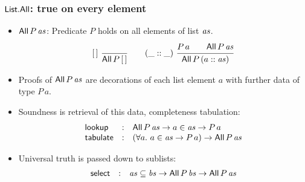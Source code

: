 \documentclass[t,fleqn,usenames,dvipsnames]{beamer}
\begin{document}
\newcommand{\All}{\mathsf{All}}
\newcommand{\ttabulate}{\mathsf{tabulate}}
\newcommand{\tselect}{\mathsf{select}}

\begin{frame}%
  \frametitle{$\List.\All$: true on every element}
  \vspace{-3ex}
  \begin{itemize}
  \item $\All\,P\,\vas$: Predicate $P$ holds on all elements of list $\mathit{as}$.
\[
  \nru{[\,]}{}{\All\,P\,[\,]}
\qquad
  \nru{(\_::\_)}{P\,a \qquad \All\,P\,\vas}{\All\,P\,(a :: \vas)}
\]
  \item Proofs of $\All\,P\,\vas$ are decorations of each list element
    $a$ with further data of type $P\,a$.
  \item Soundness is retrieval of this data, completeness tabulation:
\[
  \begin{array}{lcl}
  \tlookup   & : & \All\,P\,\vas \to a \in \vas \to P\,a \\
  \ttabulate & : & (\forall a.\ a \in \vas \to P\,a) \to \All\,P\,\vas \\
  \end{array}
\]
  \item Universal truth is passed down to sublists:
\[
  \begin{array}{lcl}
    \tselect & : & \vas \sublist \vbs \to \All\,P\,\vbs \to \All\,P\,\vas
  \end{array}
\]
  \end{itemize}
\end{frame}

\newcommand{\tsg}{\mathsf{sg}}
\end{document}
